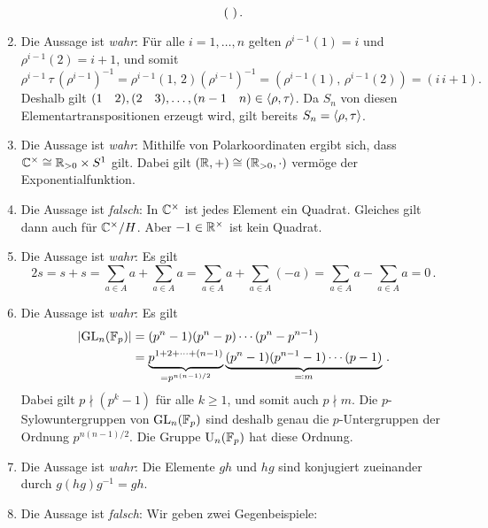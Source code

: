 \begin{solution}
\begin{enumerate}
\[\begin{psmallmatrix}
              \end{psmallmatrix} \,.
      \]
    \item
      Die Aussage ist \emph{wahr}:
      Für alle $i = 1, \dotsc, n$ gelten $\rho^{i-1}(1) = i$ und $\rho^{i-1}(2) = i+1$, und somit
      \[
        \rho^{i-1} \, \tau \, (\rho^{i-1})^{-1}
        = \rho^{i-1} (1,\, 2) (\rho^{i-1})^{-1}
        = (\rho^{i-1}(1),\, \rho^{i-1}(2))
        = (i\, i+1).
      \]
      Deshalb gilt $(1 \quad 2), (2 \quad 3), \dotsc, (n-1 \quad n) \in \langle\rho, \tau\rangle$.
      Da $S_n$ von diesen Elementartranspositionen erzeugt wird, gilt bereits $S_n = \langle\rho, \tau\rangle$.
    \item
      Die Aussage ist \emph{wahr}:
      Mithilfe von Polarkoordinaten ergibt sich, dass $\mathbb{C}^\times \cong \mathbb{R}_{> 0} \times S^1$ gilt.
      Dabei gilt $(\mathbb{R}, +) \cong (\mathbb{R}_{>0}, \cdot)$ vermöge der Exponentialfunktion.
    \item
      Die Aussage ist \emph{falsch}:
      In $\mathbb{C}^\times$ ist jedes Element ein Quadrat.
      Gleiches gilt dann auch für $\mathbb{C}^\times/H$.
      Aber $-1 \in \mathbb{R}^\times$ ist kein Quadrat.
    \item
      Die Aussage ist \emph{wahr}:
      Es gilt
      \[
          2 s
        = s + s
        = \sum_{a \in A} a + \sum_{a \in A} a
        = \sum_{a \in A} a + \sum_{a \in A} (-a)
        = \sum_{a \in A} a - \sum_{a \in A} a
        = 0 \,.
      \]
    \item
      Die Aussage ist \emph{wahr}:
      Es gilt
      \begin{align*}
            |{\operatorname{GL}_n(\mathbb{F}_p)}|
        &=  (p^n - 1)(p^n - p) \dotsm (p^n - p^{n-1}) \\
        &=  \underbrace{p^{1 + 2 + \dotsb + (n-1)}}_{= p^{n(n-1)/2}}
            \underbrace{(p^n - 1)(p^{n-1} - 1) \dotsm (p - 1)}_{\eqqcolon m} \,.
      \end{align*}
      Dabei gilt $p \nmid (p^k - 1)$ für alle $k \geq 1$, und somit auch $p \nmid m$.
      Die $p$-Sylow\-unter\-gruppen von $\operatorname{GL}_n(\mathbb{F}_p)$ sind deshalb genau die $p$-Untergruppen der Ordnung $p^{n(n-1)/2}$.
      Die Gruppe $\operatorname{U}_n(\mathbb{F}_p)$ hat diese Ordnung.
    \item
      Die Aussage ist \emph{wahr}:
      Die Elemente $gh$ und $hg$ sind konjugiert zueinander durch $g (hg) g^{-1} = gh$.
    \item
      Die Aussage ist \emph{falsch}:
      Wir geben zwei Gegenbeispiele:
      \begin{enumerate}

\end{enumerate}
\end{enumerate}
\end{solution}

